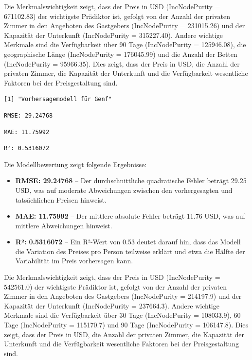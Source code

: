 \documentclass[
  journal,
]{IEEEtran}%
\begin{document}
Die Merkmalswichtigkeit zeigt, dass der Preis in USD (IncNodePurity =
671102.83) der wichtigste Prädiktor ist, gefolgt von der Anzahl der
privaten Zimmer in den Angeboten des Gastgebers (IncNodePurity =
231015.26) und der Kapazität der Unterkunft (IncNodePurity = 315227.40).
Andere wichtige Merkmale sind die Verfügbarkeit über 90 Tage
(IncNodePurity = 125946.08), die geographische Länge (IncNodePurity =
176045.99) und die Anzahl der Betten (IncNodePurity = 95966.35). Dies
zeigt, dass der Preis in USD, die Anzahl der privaten Zimmer, die
Kapazität der Unterkunft und die Verfügbarkeit wesentliche Faktoren bei
der Preisgestaltung sind.

\begin{verbatim}
[1] "Vorhersagemodell für Genf"
\end{verbatim}

\begin{verbatim}
RMSE: 29.24768 
\end{verbatim}

\begin{verbatim}
MAE: 11.75992 
\end{verbatim}

\begin{verbatim}
R²: 0.5316072 
\end{verbatim}

Die Modellbewertung zeigt folgende Ergebnisse:

\begin{itemize}
\item
  \textbf{RMSE: 29.24768} -- Der durchschnittliche quadratische Fehler
  beträgt 29.25 USD, was auf moderate Abweichungen zwischen den
  vorhergesagten und tatsächlichen Preisen hinweist.
\item
  \textbf{MAE: 11.75992} -- Der mittlere absolute Fehler beträgt 11.76
  USD, was auf mittlere Abweichungen hinweist.
\item
  \textbf{R²: 0.5316072} -- Ein R²-Wert von 0.53 deutet darauf hin, dass
  das Modell die Variation des Preises pro Person teilweise erklärt und
  etwa die Hälfte der Variabilität im Preis vorhersagen kann.
\end{itemize}

Die Merkmalswichtigkeit zeigt, dass der Preis in USD (IncNodePurity =
542561.0) der wichtigste Prädiktor ist, gefolgt von der Anzahl der
privaten Zimmer in den Angeboten des Gastgebers (IncNodePurity =
214197.9) und der Kapazität der Unterkunft (IncNodePurity = 237664.3).
Andere wichtige Merkmale sind die Verfügbarkeit über 30 Tage
(IncNodePurity = 108033.9), 60 Tage (IncNodePurity = 115170.7) und 90
Tage (IncNodePurity = 106147.8). Dies zeigt, dass der Preis in USD, die
Anzahl der privaten Zimmer, die Kapazität der Unterkunft und die
Verfügbarkeit wesentliche Faktoren bei der Preisgestaltung sind.
\end{document}
